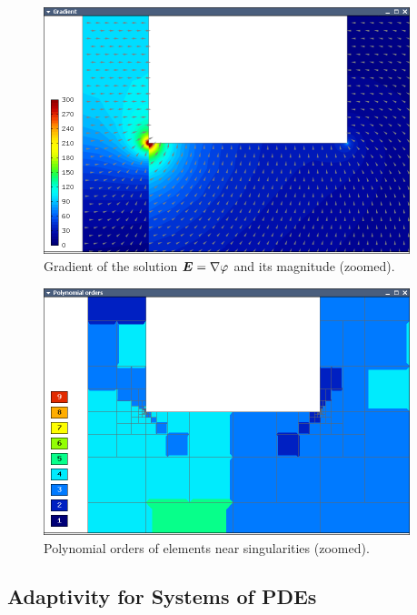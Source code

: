 \begin{figure}[ht]
  \medskip \centering
  \includegraphics[width=0.95\textwidth]{img/motor-grad.png}
  \caption{Gradient of the solution $\mbox{\boldmath $E$} = \nabla\varphi$ and its magnitude (zoomed).}
  \label{fig:motor-grad}
\end{figure}

\begin{figure}[ht]
  \medskip \centering
  \includegraphics[width=0.95\textwidth]{img/motor-orders.png}
  \caption{Polynomial orders of elements near singularities (zoomed).}
  \label{fig:motor-orders}
\end{figure}

\clearpage


\subsection{Adaptivity for Systems of PDEs}

